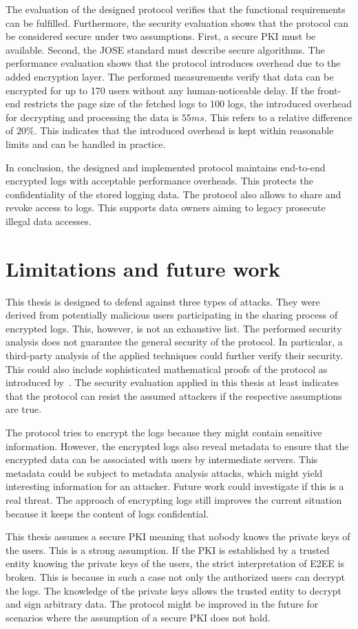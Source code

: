 \documentclass[../main.tex]{subfiles}
\begin{document}
The evaluation of the designed protocol verifies that the functional requirements can be fulfilled.
Furthermore, the security evaluation shows that the protocol can be considered secure under two assumptions.
First, a secure PKI must be available.
Second, the JOSE standard must describe secure algorithms.
The performance evaluation shows that the protocol introduces overhead due to the added encryption layer.
The performed measurements verify that data can be encrypted for up to 170 users without any human-noticeable delay.
If the front-end restricts the page size of the fetched logs to 100 logs, the introduced overhead for decrypting and processing the data is $55ms$.
This refers to a relative difference of $20\%$.
This indicates that the introduced overhead is kept within reasonable limits and can be handled in practice.

In conclusion, the designed and implemented protocol maintains end-to-end encrypted logs with acceptable performance overheads.
This protects the confidentiality of the stored logging data.
The protocol also allows to share and revoke access to logs.
This supports data owners aiming to legacy prosecute illegal data accesses.


\section{Limitations and future work}
\label{sec:limitations}
This thesis is designed to defend against three types of attacks.
They were derived from potentially malicious users participating in the sharing process of encrypted logs.
This, however, is not an exhaustive list.
The performed security analysis does not guarantee the general security of the protocol.
In particular, a third-party analysis of the applied techniques could further verify their security.
This could also include sophisticated mathematical proofs of the protocol as introduced by~\cite{Katz2020}.   
The security evaluation applied in this thesis at least indicates that the protocol can resist the assumed attackers if the respective assumptions are true.

The protocol tries to encrypt the logs because they might contain sensitive information.
However, the encrypted logs also reveal metadata to ensure that the encrypted data can be associated with users by intermediate servers.
This metadata could be subject to metadata analysis attacks, which might yield interesting information for an attacker.
Future work could investigate if this is a real threat.
The approach of encrypting logs still improves the current situation because it keeps the content of logs confidential.

This thesis assumes a secure PKI meaning that nobody knows the private keys of the users.
This is a strong assumption.
If the PKI is established by a trusted entity knowing the private keys of the users, the strict interpretation of E2EE is broken.
This is because in such a case not only the authorized users can decrypt the logs.
The knowledge of the private keys allows the trusted entity to decrypt and sign arbitrary data.
The protocol might be improved in the future for scenarios where the assumption of a secure PKI does not hold.
\end{document}
